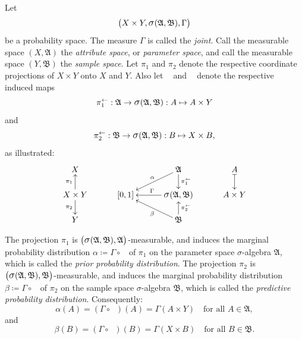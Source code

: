\documentclass[
twoside=true,
paper=letter,
fontsize=9pt,
pagesize=auto,
leqno,
openany,
headsepline,
overfullrule,
]{scrbook}
\theoremstyle{plain}
\theoremstyle{plain}
\theoremstyle{definition}
\theoremstyle{bfnoteitalic}
\theoremstyle{bfnoteroman}
\newcommand{\sigalg}[1]{\mathfrak{#1}}
\newcommand{\definedby}{\coloneqq}
\newcommand{\sagb}{\mathop{\hbox{\large{$\sigma$}}}\nolimits}
\newcommand{\textsigma}{\hbox{\large{$\sigma$}}\kern-1pt}
\newcommand{\preimage}[1]{\mathop{#1^{\leftarrow}}}
\newcommand{\productsig}[2]{\sagb(#1,#2)}
\newcommand{\measurespace}{X}
\newcommand{\measurespaceii}{Y}
\newcommand{\seti}{A}
\newcommand{\setii}{B}
\newcommand{\projectionone}{\pi_1}
\newcommand{\projectiontwo}{\pi_2}
\newcommand{\pspace}{\measurespace}%
\newcommand{\sspace}{\measurespaceii}%
\newcommand{\pspaceset}{A}
\newcommand{\sspaceset}{B}
\newcommand{\sspacesig}{\sigalg{B}}
\newcommand{\pspacesig}{\sigalg{A}}
\newcommand{\measonprod}{\Gamma}%
\newcommand{\marginalone}{\alpha}%
\newcommand{\marginaltwo}{\beta}%
\newcommand{\prior}{\marginalone}
\newcommand{\predictive}{\marginaltwo}
\begin{document}
Let
\[
\bigl(\pspace\times\sspace,
\productsig{\pspacesig}{\sspacesig},
\measonprod\bigr)
\]
be a probability space.
The measure $\measonprod$ is called the \emph{joint}.
Call the measurable space $(\pspace, \pspacesig)$ the \emph{attribute space}, or \emph{parameter space}, and call the measurable space
$(\sspace, \sspacesig)$ the
\emph{sample space}.
Let $\projectionone$ and $\projectiontwo$ denote the respective coordinate projections of
$\pspace\times\sspace$ onto $\pspace$ and $\sspace$. Also let $\preimage{\projectionone}$ and
$\preimage{\projectiontwo}$ denote the respective induced maps
\[
\preimage{\projectionone}
:\pspacesig\to\productsig{\pspacesig}{\sspacesig}
:\seti \mapsto \seti\times\measurespaceii
\]
and
\[
\preimage{\projectiontwo}
:\sspacesig\to\productsig{\pspacesig}{\sspacesig}
:\setii \mapsto \measurespace\times\setii,
\]
as illustrated:
\[
\xymatrix@R=16pt@C=30pt{
\pspace
&
&
\pspacesig
\ar[d]^-{\preimage{\projectionone}}
\ar[dl]_-{\marginalone}
& \seti \ar@{|->}[d]
\\
\pspace\times\sspace \ar[u]^-{\projectionone} \ar[d]_-{\projectiontwo} &
[0,1] &
\productsig{\pspacesig}{\sspacesig}  \ar[l]_\measonprod
& \seti\times\sspace
\\
\sspace
&
&
\sspacesig
\ar[u]_-{\preimage{\projectiontwo}}
\ar[ul]^-{\marginaltwo}
\\
}
\]

The projection $\projectionone$
is
$\bigl( \productsig{\pspacesig}{\sspacesig}, \pspacesig \bigr)$\hyp{}measurable,
and induces the marginal probability distribution
$\marginalone\definedby\measonprod\circ\preimage{\projectionone}$ of $\projectionone$ on the parameter space
\textsigma-algebra $\pspacesig$,
which is called the \emph{prior probability distribution}.
The projection $\projectiontwo$
is
$\bigl(\productsig{\pspacesig}{\sspacesig}, \sspacesig \bigr)$\hyp{}measurable,
and induces the marginal probability distribution
$\marginaltwo\definedby\measonprod\circ\preimage{\projectiontwo}$ of $\projectiontwo$ on the sample space
\textsigma-algebra $\sspacesig$,
which is called the \emph{predictive probability distribution}.
Consequently:
\[
\prior(\pspaceset)
= ( \measonprod\circ\preimage{\projectionone} ) (\pspaceset)
= \measonprod(\pspaceset\times\sspace)
\quad \text{for all $\pspaceset\in\pspacesig$},
\]
and
\[
\predictive(\sspaceset)
= ( \measonprod\circ\preimage{\projectiontwo} ) (\sspaceset)
= \measonprod(\pspace\times\sspaceset)
\quad \text{for all $\sspaceset\in\sspacesig$}.
\]
\end{document}
